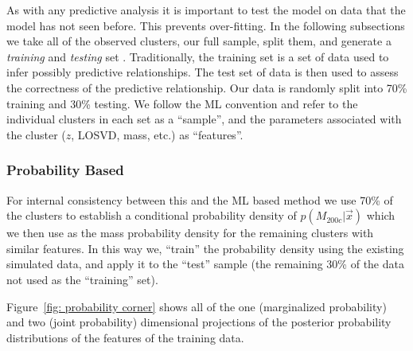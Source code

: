 \documentclass[fleqn,usenatbib]{mnras}
\begin{document}
As with any predictive analysis it is important to test the model on data that the model has not seen before. This prevents over-fitting. In the following subsections we take all of the observed clusters, our full sample, split them, and generate a \emph{training} and \emph{testing} set . Traditionally, the training set is a set of data used to infer possibly predictive relationships. The test set of data is then used to assess the correctness of the predictive relationship. Our data is randomly split into 70\% training and 30\% testing. We follow the ML convention and refer to the individual clusters in each set as a ``sample'', and the parameters associated with the cluster ($z$, LOSVD, mass, etc.) as ``features''.

\subsubsection{Probability Based}\label{sec:probability method}
For internal consistency between this and the ML based method we use 70\% of the clusters to establish a conditional probability density of $p(M_{200c} | \vec{x})$ which we then use as the mass probability density for the remaining clusters with similar features. In this way we, ``train'' the probability density using the existing simulated data, and apply it to the ``test'' sample (the remaining 30\% of the data not used as the ``training'' set).

Figure~\ref{fig: probability corner} shows all of the one (marginalized probability) and two (joint probability) dimensional projections of the posterior probability distributions of the features of the training data.
\end{document}

